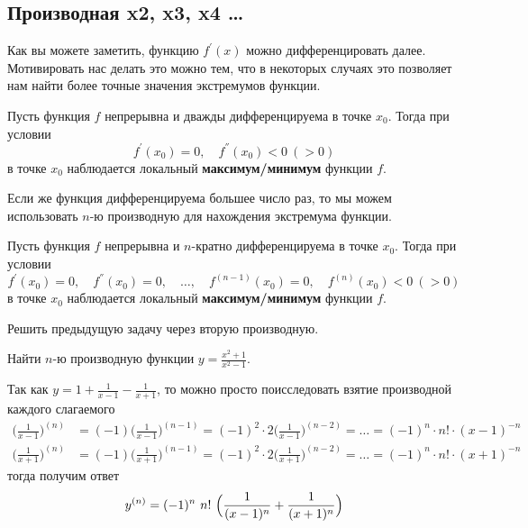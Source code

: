 \subsection{Производная x2, x3, x4 \dots}
Как вы можете заметить, функцию $f^{'}(x)$ можно дифференцировать далее. Мотивировать нас делать это можно тем, что в некоторых случаях это позволяет нам найти более точные значения экстремумов функции.
\begin{theorem}
    Пусть функция $f$ непрерывна и дважды дифференцируема в точке $x_0$. Тогда при условии
    \begin{equation*}
        f^{'}(x_0) = 0, \quad f^{''}(x_0) < 0\ (>0)
    \end{equation*}
    в точке $x_0$ наблюдается локальный \textbf{максимум/минимум} функции $f$.
\end{theorem}
Если же функция дифференцируема большее число раз, то мы можем использовать $n$-ю производную для нахождения экстремума функции.
\begin{theorem}
    Пусть функция $f$ непрерывна и $n$-кратно дифференцируема в точке $x_0$. Тогда при условии
    \begin{equation*}
        f^{'}(x_0) = 0, \quad f^{''}(x_0) = 0, \quad \dots, \quad f^{(n-1)}(x_0) = 0, \quad f^{(n)}(x_0) < 0\ (>0)
    \end{equation*}
    в точке $x_0$ наблюдается локальный \textbf{максимум/минимум} функции $f$.
\end{theorem}
\begin{prac}
    Решить предыдущую задачу через вторую производную.
\end{prac}

\begin{example}
    Найти $n$-ю производную функции $y = \frac{x^2 + 1}{x^2 - 1}$.

    Так как $y = 1 + \frac{1}{x - 1} - \frac{1}{x+1}$, то можно просто поисследовать взятие производной каждого слагаемого
    \begin{eqnarray*}
        \bigl(\frac{1}{x-1}\bigr)^{(n)} &= (-1)\bigl(\frac{1}{x - 1}\bigr)^{(n-1)} = (-1)^2 \cdot 2\bigl(\frac{1}{x - 1}\bigr)^{(n-2)} = \dots = (-1)^n \cdot n! \cdot (x - 1)^{-n}\\
        \bigl(\frac{1}{x+1}\bigr)^{(n)} &= (-1)\bigl(\frac{1}{x + 1}\bigr)^{(n-1)} = (-1)^2 \cdot 2\bigl(\frac{1}{x + 1}\bigr)^{(n-2)} = \dots = (-1)^n \cdot n! \cdot (x + 1)^{-n}
    \end{eqnarray*}
    тогда получим ответ
    \begin{equation*}
        y^{(n)} = (-1)^n\ n!\ \Bigl(\frac{1}{(x - 1)^n} + \frac{1}{(x + 1)^n}\Bigr)
    \end{equation*}
\end{example}


